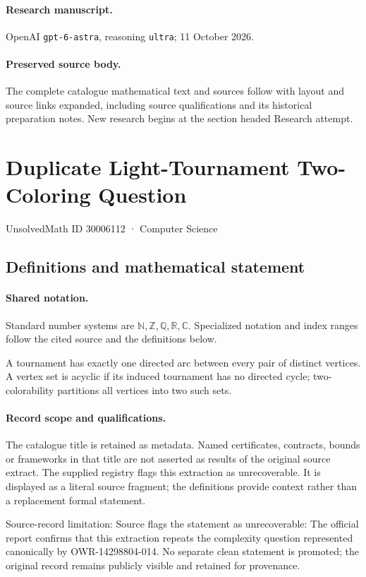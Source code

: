 \documentclass[11pt]{article}
\begin{document}
\paragraph{Research manuscript.} OpenAI \texttt{gpt-6-astra}, reasoning \texttt{ultra}; 11 October 2026.
\paragraph{Preserved source body.} The complete catalogue mathematical text and sources follow with layout and source links expanded, including source qualifications and its historical preparation notes. New research begins at the section headed Research attempt.

\section{Duplicate Light-Tournament Two-Coloring Question}\label{30006112}
{\small UnsolvedMath ID 30006112 · Computer Science}
\subsection{Definitions and mathematical statement}

\paragraph{Shared notation.}Standard number systems are $\mathbb N,\mathbb Z,\mathbb Q,\mathbb R,\mathbb C$. Specialized notation and index ranges follow the cited source and the definitions below.


A tournament has exactly one directed arc between every pair of distinct vertices. A vertex set is acyclic if its induced tournament has no directed cycle; two-colorability partitions all vertices into two such sets.
\paragraph{Record scope and qualifications.}
The catalogue title is retained as metadata. Named certificates, contracts, bounds or frameworks in that title are not asserted as results of the original source extract.
The supplied registry flags this extraction as unrecoverable. It is displayed as a literal source fragment; the definitions provide context rather than a replacement formal statement.

Source-record limitation: Source flags the statement as unrecoverable: The official report confirms that this extraction repeats the complexity question represented canonically by OWR-14298804-014. No separate clean statement is promoted; the original record remains publicly visible and retained for provenance.
\end{document}
